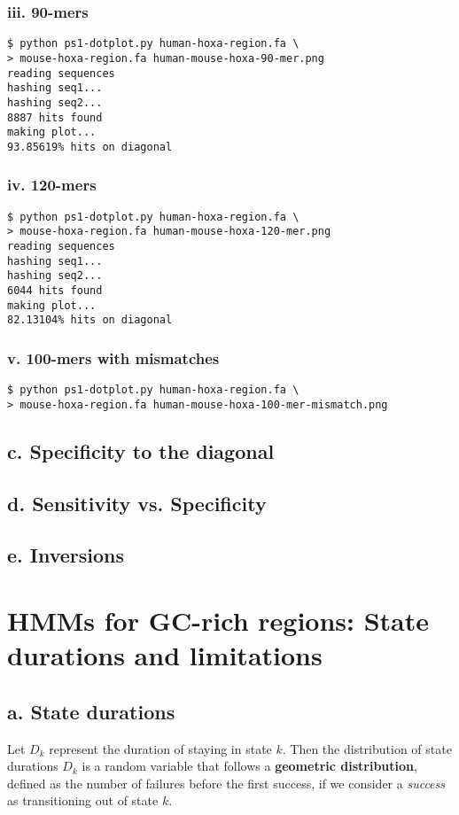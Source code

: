\documentclass[a4paper]{article}
\begin{document}
\subsubsection*{iii. 90-mers}
\begin{verbatim}
$ python ps1-dotplot.py human-hoxa-region.fa \
> mouse-hoxa-region.fa human-mouse-hoxa-90-mer.png
reading sequences
hashing seq1...
hashing seq2...
8887 hits found
making plot...
93.85619% hits on diagonal
\end{verbatim}

\subsubsection*{iv. 120-mers}
\begin{verbatim}
$ python ps1-dotplot.py human-hoxa-region.fa \
> mouse-hoxa-region.fa human-mouse-hoxa-120-mer.png
reading sequences
hashing seq1...
hashing seq2...
6044 hits found
making plot...
82.13104% hits on diagonal
\end{verbatim}

\subsubsection*{v. 100-mers with mismatches}
\begin{verbatim}
$ python ps1-dotplot.py human-hoxa-region.fa \
> mouse-hoxa-region.fa human-mouse-hoxa-100-mer-mismatch.png
\end{verbatim}

\subsection*{c. Specificity to the diagonal}
\subsection*{d. Sensitivity vs. Specificity}
\subsection*{e. Inversions}

\section{HMMs for GC-rich regions: State durations and limitations}

\subsection*{a. State durations}
Let $D_k$ represent the duration of staying in state $k$. Then the
distribution of state durations $D_k$ is a random variable that follows a
{\bf geometric distribution}, defined as the number of failures
before the first success, if we consider a {\it success} as transitioning out of 
state $k$.
\end{document}
